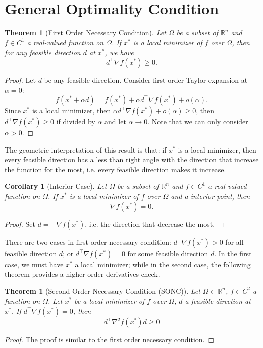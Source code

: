 \documentclass[12pt,a4paper]{report}
\numberwithin{equation}{section}
\theoremstyle{mystyle}
\newtheorem{theorem}[definition]{Theorem}
\newtheorem{corollary}[definition]{Corollary}
\newcommand{\R}{\mathbb{R}}
\newcommand{\grad}{\nabla}
\newcommand{\T}{\top}
\begin{document}
	\section{General Optimality Condition}\label{sec:general optimality condition}
	\begin{theorem}[First Order Necessary Condition]
		Let $\Omega$ be a subset of $\R^n$ and $f\in C^1$ a real-valued function on $\Omega$. If $x^*$ is a local minimizer of $f$ over $\Omega$, then for any feasible direction $d$ at $x^*$, we have
		$$
		d^\T \grad f(x^*)\geq 0.
		$$
	\end{theorem}
	\begin{proof}
		Let $d$ be any feasible direction. Consider first order Taylor expansion at $\alpha=0$:
		$$
		f(x^*+\alpha d)= f(x^*)+\alpha d^\T \grad f(x^*) +o(\alpha).
		$$
		Since $x^*$ is a local minimizer, then $\alpha d^\T \grad f(x^*) +o(\alpha)\geq 0$, then $d^\T \grad f(x^*)\geq 0$ if divided by $\alpha$ and let $\alpha\to 0$. Note that we can only consider $\alpha>0$.
	\end{proof}
	The geometric interpretation of this result is that: if $x^*$ is a local minimizer, then every feasible direction has a less than right angle with the direction that increase the function for the most, i.e. every feasible direction makes it increase.
	
	\begin{corollary}[Interior Case]
		Let $\Omega$ be a subset of $\R^n$ and $f\in C^1$ a real-valued function on $\Omega$. If $x^*$ is a local minimizer of $f$ over $\Omega$ and a interior point, then 
		$$
		\grad f(x^*)=0.
		$$
	\end{corollary}
	\begin{proof}
		Set $d=-\grad f(x^*)$, i.e. the direction that decrease the most.
	\end{proof}
	
	There are two cases in first order necessary condition: $d^\T \grad f(x^*)>0$ for all feasible direction $d$; or $d^\T \grad f(x^*)=0$ for some feasible direction $d$. In the first case, we must have $x^*$ a local minimizer; while in the second case, the following theorem provides a higher order derivatives check.
	
	\begin{theorem}[Second Order Necessary Condition (SONC)]
		Let $\Omega\subset \R^n$, $f\in C^2$ a function on $\Omega$. Let $x^*$ be a local minimizer of $f$ over $\Omega$, $d$ a feasible direction at $x^*$. If $d^\T \grad f(x^*)=0$, then
		$$
		d^\T \grad^2 f(x^*) d\geq 0
		$$
	\end{theorem}
	\begin{proof}
		The proof is similar to the first order necessary condition.
	\end{proof}
	
\end{document}
